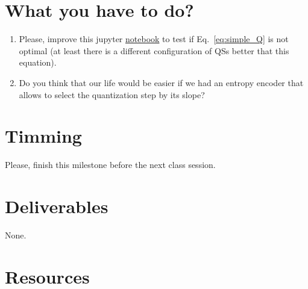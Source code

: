 \section{What you have to do?}
\begin{enumerate}
\item Please, improve this jupyter
  \href{https://github.com/Sistemas-Multimedia/Sistemas-Multimedia.github.io/blob/master/milestones/05-quantization/performance.ipynb}{notebook}
  to test if Eq.~\ref{eq:simple_Q} is not optimal (at least there is a
  different configuration of QSs better that this equation).
\item Do you think that our life would be easier if we had an entropy
  encoder that allows to select the quantization step by its slope?
\end{enumerate}

\section{Timming}

Please, finish this milestone before the next class session.

\section{Deliverables}

None.

\section{Resources}

\renewcommand{\addcontentsline}[3]{}%

